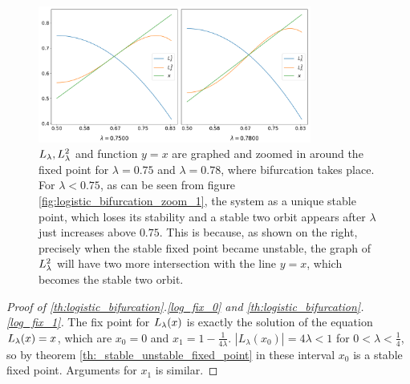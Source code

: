 \begin{figure}[htbp]
	\centering
	\includegraphics[width=0.8\textwidth]{./figures/logistic_map_around_bifurcation.png}
	\caption{
		$L_{\lambda}, L_{\lambda}^2$ and function $y=x$ are graphed and zoomed in around the fixed point for $\lambda = 0.75$ and $\lambda = 0.78$, where bifurcation takes place.
		For $\lambda < 0.75$, as can be seen from figure \ref{fig:logistic_bifurcation_zoom_1}, the system as a unique stable point,
		which loses its stability and a stable two orbit appears after $\lambda$ just increases above $0.75$.
		This is because, as shown on the right, precisely when the stable fixed point became unstable, the graph of $L_{\lambda}^2$ will have two more intersection with the line $y=x$, which becomes the stable two orbit.
	}
	\label{fig:point_of_bifurcation1}
\end{figure}

\begin{proof}[Proof of \ref{th:logistic_bifurcation}.\ref{log_fix_0} and \ref{th:logistic_bifurcation}.\ref{log_fix_1}]
	The fix point for $L_{\lambda}(x)$ is exactly the solution of the equation $L_{\lambda}(x) = x$, which are $x_0 = 0$ and $x_1 = 1 - \frac{1}{4\lambda}$. 
	$|L_{\lambda}(x_0) | = 4 \lambda < 1$ for $0 < \lambda < \frac{1}{4}$, so by theorem \ref{th:_stable_unstable_fixed_point} in these interval $x_0$ is a stable fixed point.
	Arguments for $x_1$ is similar.
\end{proof}


